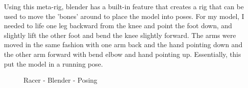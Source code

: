 \documentclass[a4 paper, 12pt]{article}
\begin{document}
Using this meta-rig, blender has a built-in feature that creates a rig that can be used to move the 'bones' around to place the model into poses. For my model, I needed to life one leg backward from the knee and point the foot down, and slightly lift the other foot and bend the knee slightly forward. The arms were moved in the same fashion with one arm back and the hand pointing down and the other arm forward with bend elbow and hand pointing up. Essentially, this put the model in a running pose.
    \begin{figure} [H]
        \caption{Racer - Blender - Posing}   
    \end{figure}
\end{document}
